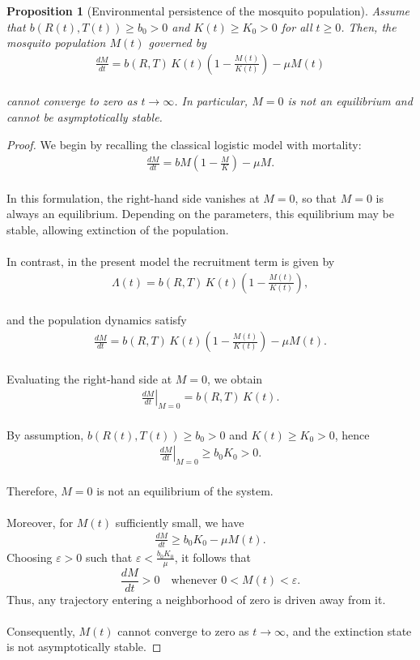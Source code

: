 \documentclass[a4paper,fleqn]{cas-dc}
\newtheorem{proposition}{Proposition}
\begin{document}
\begin{proposition}[Environmental persistence of the mosquito population]
\label{prop:persistence}
Assume that $b(R(t),T(t)) \geq b_0 > 0$ and $K(t) \geq K_0 > 0$ for all $t \geq 0$. 
Then, the mosquito population $M(t)$ governed by
\begin{align}
\frac{dM}{dt} = b(R,T)\,K(t)\left(1 - \frac{M(t)}{K(t)}\right) - \mu M(t)
\end{align}
\\
cannot converge to zero as $t \to \infty$. In particular, $M=0$ is not an equilibrium and cannot be asymptotically stable.
\end{proposition}

\begin{proof}
We begin by recalling the classical logistic model with mortality:
\begin{align}
\frac{dM}{dt} = bM\left(1 - \frac{M}{K}\right) - \mu M.
\end{align}
\\
In this formulation, the right-hand side vanishes at $M=0$, so that $M=0$ is always an equilibrium. 
Depending on the parameters, this equilibrium may be stable, allowing extinction of the population.
\\\\
In contrast, in the present model the recruitment term is given by
\begin{align}
\Lambda(t) = b(R,T)\,K(t)\left(1 - \frac{M(t)}{K(t)}\right),
\end{align}
\\
and the population dynamics satisfy
\begin{align}
\frac{dM}{dt} = b(R,T)\,K(t)\left(1 - \frac{M(t)}{K(t)}\right) - \mu M(t).
\end{align}
\\
Evaluating the right-hand side at $M=0$, we obtain
\begin{align}
\left.\frac{dM}{dt}\right|_{M=0} = b(R,T)\,K(t).
\end{align}
\\
By assumption, $b(R(t),T(t)) \geq b_0 > 0$ and $K(t) \geq K_0 > 0$, hence
\begin{align}
\left.\frac{dM}{dt}\right|_{M=0} \geq b_0 K_0 > 0.
\end{align}
\\
Therefore, $M=0$ is not an equilibrium of the system.
\\\\
Moreover, for $M(t)$ sufficiently small, we have
\begin{align}
\frac{dM}{dt} \geq b_0 K_0 - \mu M(t).
\end{align}
Choosing $\varepsilon > 0$ such that $\varepsilon < \frac{b_0 K_0}{\mu}$, it follows that
\[
\frac{dM}{dt} > 0 \quad \text{whenever } 0 < M(t) < \varepsilon.
\]
Thus, any trajectory entering a neighborhood of zero is driven away from it.
\\\\
Consequently, $M(t)$ cannot converge to zero as $t \to \infty$, and the extinction state is not asymptotically stable.
\end{proof}
\end{document}
